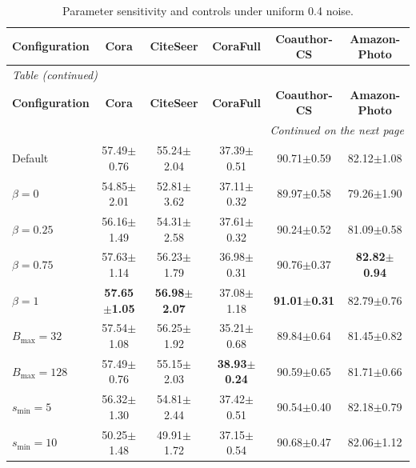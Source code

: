 \begingroup
\fontsize{9}{11}\selectfont
\setlength{\tabcolsep}{5pt}
\renewcommand{\arraystretch}{1.15}
\begin{longtable}{@{}lccccc@{}}
\caption{Parameter sensitivity and controls under uniform 0.4 noise.}\label{tab:I.1}\\
\toprule
\textbf{Configuration} & \textbf{Cora} & \textbf{CiteSeer} & \textbf{CoraFull} & \textbf{Coauthor-CS} & \textbf{Amazon-Photo} \\
\midrule
\endfirsthead
\multicolumn{6}{l}{\small\itshape Table \thetable{} (continued)}\\
\toprule
\textbf{Configuration} & \textbf{Cora} & \textbf{CiteSeer} & \textbf{CoraFull} & \textbf{Coauthor-CS} & \textbf{Amazon-Photo} \\
\midrule
\endhead
\midrule\multicolumn{6}{r}{\small\itshape Continued on the next page}\\
\endfoot
\bottomrule
\endlastfoot
Default & 57.49\ensuremath{\pm}0.76 & 55.24\ensuremath{\pm}2.04 & 37.39\ensuremath{\pm}0.51 & 90.71\ensuremath{\pm}0.59 & 82.12\ensuremath{\pm}1.08 \\
\(\beta=0\) & 54.85\ensuremath{\pm}2.01 & 52.81\ensuremath{\pm}3.62 & 37.11\ensuremath{\pm}0.32 & 89.97\ensuremath{\pm}0.58 & 79.26\ensuremath{\pm}1.90 \\
\(\beta=0.25\) & 56.16\ensuremath{\pm}1.49 & 54.31\ensuremath{\pm}2.58 & 37.61\ensuremath{\pm}0.32 & 90.24\ensuremath{\pm}0.52 & 81.09\ensuremath{\pm}0.58 \\
\(\beta=0.75\) & 57.63\ensuremath{\pm}1.14 & 56.23\ensuremath{\pm}1.79 & 36.98\ensuremath{\pm}0.31 & 90.76\ensuremath{\pm}0.37 & \textbf{82.82\ensuremath{\pm}0.94} \\
\(\beta=1\) & \textbf{57.65\ensuremath{\pm}1.05} & \textbf{56.98\ensuremath{\pm}2.07} & 37.08\ensuremath{\pm}1.18 & \textbf{91.01\ensuremath{\pm}0.31} & 82.79\ensuremath{\pm}0.76 \\
\(B_{\max}=32\) & 57.54\ensuremath{\pm}1.08 & 56.25\ensuremath{\pm}1.92 & 35.21\ensuremath{\pm}0.68 & 89.84\ensuremath{\pm}0.64 & 81.45\ensuremath{\pm}0.82 \\
\(B_{\max}=128\) & 57.49\ensuremath{\pm}0.76 & 55.15\ensuremath{\pm}2.03 & \textbf{38.93\ensuremath{\pm}0.24} & 90.59\ensuremath{\pm}0.65 & 81.71\ensuremath{\pm}0.66 \\
\(s_{\min}=5\) & 56.32\ensuremath{\pm}1.30 & 54.81\ensuremath{\pm}2.44 & 37.42\ensuremath{\pm}0.51 & 90.54\ensuremath{\pm}0.40 & 82.18\ensuremath{\pm}0.79 \\
\(s_{\min}=10\) & 50.25\ensuremath{\pm}1.48 & 49.91\ensuremath{\pm}1.72 & 37.15\ensuremath{\pm}0.54 & 90.68\ensuremath{\pm}0.47 & 82.06\ensuremath{\pm}1.12 \\

\end{longtable}

